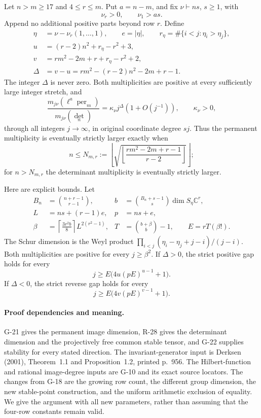 \begin{theorem}\label{G-23}
Let $n>m\ge17$ and $4\le r\le m$. Put $a=n-m$, and fix
$\nu\vdash ns$, $s\ge1$, with
\[
 \nu_r>0,\qquad \nu_1>as.
\]
Append no additional positive parts beyond row $r$.
Define
\[
 \begin{split}
 \eta&=\nu-\nu_r(1,\ldots,1),\qquad e=|\eta|,\qquad
 r_\eta=\#\{i<j:\eta_i>\eta_j\},\\
 u&=(r-2)n^2+r_\eta-r^2+3,\\
 v&=rm^2-2m+r+r_\eta-r^2+2,\\
 \Delta&=v-u=rm^2-(r-2)n^2-2m+r-1.
 \end{split}
\]
The integer $\Delta$ is never zero. Both multiplicities are
positive at every sufficiently large integer stretch, and
\begin{equation}\label{G23:ratio}
 \frac{m_{j\nu}(\ell^a\operatorname{per}_m)}
      {m_{j\nu}(\det_n)}
 =\kappa_\nu j^\Delta(1+O(j^{-1})),\qquad \kappa_\nu>0,
\end{equation}
through all integers $j\to\infty$, in original coordinate degree $sj$.
Thus the permanent multiplicity is eventually strictly larger
exactly when
\begin{equation}\label{G23:boundary}
 n\le N_{m,r}:=
 \left\lfloor\sqrt{\left\lfloor
       \frac{rm^2-2m+r-1}{r-2}\right\rfloor}\right\rfloor;
\end{equation}
for $n>N_{m,r}$ the determinant multiplicity is eventually strictly larger.

Here are explicit bounds. Let
\[
 \begin{aligned}
 B_n&=\binom{n+r-1}{r-1},&
 b&=\binom{B_n+s-1}{s}\dim S_\eta\mathbb C^r,\\
 L&=ns+(r-1)e,&p&=ns+e,\\
 \beta&=\left\lceil\frac{3r^2b}{8}\right\rceil
                          L^{2(r^2-1)},&
 T&=\binom{b+\beta}{b}-1,\qquad E=rT(\beta!).
 \end{aligned}
\]
The Schur dimension is the Weyl product
$\prod_{i<j}(\eta_i-\eta_j+j-i)/(j-i)$.
Both multiplicities are positive for every $j\ge\beta^2$.
If $\Delta>0$, the strict positive gap holds for every
\[
 j\ge E\bigl(4u(pE)^{u-1}+1\bigr).
\]
If $\Delta<0$, the strict reverse gap holds for every
\[
 j\ge E\bigl(4v(pE)^{v-1}+1\bigr).
\]
\end{theorem}

\paragraph{Proof dependencies and meaning.}
G-21 gives the permanent image dimension, R-28 gives the
determinant dimension and the projectively free common stable
tensor, and G-22 supplies stability for every stated direction.
The invariant-generator input is Derksen (2001), Theorem~1.1
and Proposition~1.2, printed p.~956. The Hilbert-function and
rational image-degree inputs are G-10 and its exact source
locators. The changes from G-18 are the growing row count,
the different group dimension, the new stable-point construction,
and the uniform arithmetic exclusion of equality. We give the
argument with all new parameters, rather than assuming that
the four-row constants remain valid.

